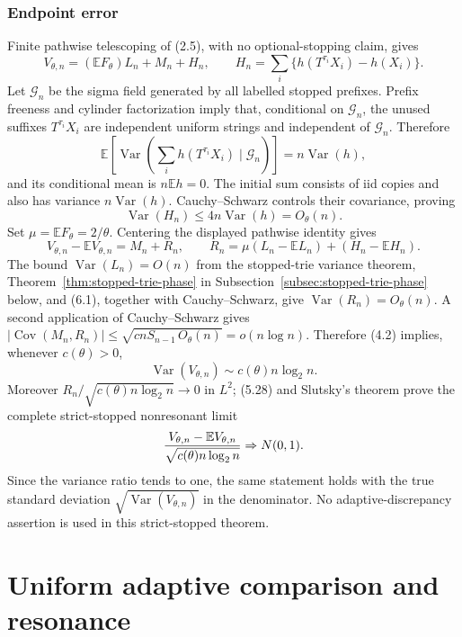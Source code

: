 \documentclass[11pt]{article}
\numberwithin{equation}{section}
\newcommand{\E}{\mathbb E}\newcommand{\Pp}{\mathbb P}
\newcommand{\Var}{\operatorname{Var}}\newcommand{\Cov}{\operatorname{Cov}}
\newcommand{\1}{\mathbf 1}\newcommand{\F}{\mathcal F}\newcommand{\D}{\mathcal D}
\begin{document}
\section{Endpoint error}\label{sec:uniform-endpoint}
Finite pathwise telescoping of (2.5), with no optional-stopping claim, gives
\[
 V_{\theta,n}=(\E F_\theta)L_n+M_n+H_n,\qquad
 H_n=\sum_i\{h(T^{\tau_i}X_i)-h(X_i)\}.
\]
Let $\mathcal G_n$ be the sigma field generated by all labelled stopped
prefixes.  Prefix freeness and cylinder factorization imply that, conditional
on $\mathcal G_n$, the unused suffixes $T^{\tau_i}X_i$ are independent
uniform strings and independent of $\mathcal G_n$.  Therefore
\[
 \E[\Var(\sum_i h(T^{\tau_i}X_i)\mid\mathcal G_n)]=n\Var(h),
\]
and its conditional mean is $n\E h=0$.  The initial sum consists of iid
copies and also has variance $n\Var(h)$.  Cauchy--Schwarz controls their
covariance, proving
\begin{equation}\Var(H_n)\leq4n\Var(h)=O_\theta(n).             \tag{6.1}\end{equation}
Set $\mu=\E F_\theta=2/\theta$.  Centering the displayed pathwise identity
gives
\[
 V_{\theta,n}-\E V_{\theta,n}
 =M_n+R_n,\qquad
 R_n=\mu(L_n-\E L_n)+(H_n-\E H_n).
\]
The bound $\Var(L_n)=O(n)$ from the stopped-trie variance theorem,
Theorem~\ref{thm:stopped-trie-phase} in Subsection~\ref{subsec:stopped-trie-phase} below,
and (6.1), together
with Cauchy--Schwarz, give $\Var(R_n)=O_\theta(n)$.  A second application of
Cauchy--Schwarz gives
$|\Cov(M_n,R_n)|\le\sqrt{c nS_{n-1}\,O_\theta(n)}
=o(n\log n)$.  Therefore (4.2) implies, whenever $c(\theta)>0$,
\[
 \Var(V_{\theta,n})\sim c(\theta)n\log_2n.
\]
Moreover $R_n/\sqrt{c(\theta)n\log_2n}\to0$ in $L^2$; (5.28) and Slutsky's
theorem prove the complete strict-stopped nonresonant limit
\[
 {V_{\theta,n}-\E V_{\theta,n}\over
       \sqrt{c(\theta)n\log_2n}}\Rightarrow N(0,1).
\]
Since the variance ratio tends to one, the same statement holds with the
true standard deviation $\sqrt{\Var(V_{\theta,n})}$ in the denominator.
No adaptive-discrepancy assertion is used in this strict-stopped theorem.

\part{Uniform adaptive comparison and resonance}
\end{document}

